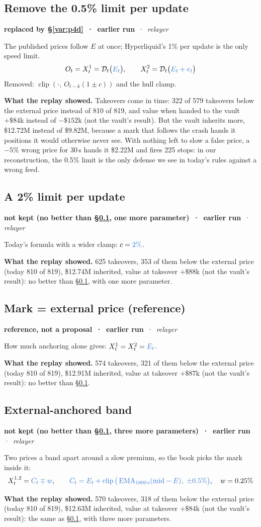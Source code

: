 \documentclass[10.5pt,a4paper]{article}
\newcommand{\chg}[1]{\ensuremath{{\color[HTML]{2F74D0}#1}}}
\newcommand{\rem}[1]{\textcolor{rem}{\ensuremath{#1}}}
\newcommand{\clip}{\operatorname{clip}}
\newcommand{\ema}{\operatorname{EMA}}
\newcommand{\D}{\mathcal{D}}
\newcommand{\st}[3]{\textcolor{#1}{\textbf{#2}} \,·\, \emph{#3}\par}
\newcommand{\res}[1]{\par\textbf{What the replay showed.} #1\par}
\begin{document}
\subsection{Remove the 0.5\% limit per update}\label{var:p1}
\st{sup}{replaced by \S\ref{var:p4d} \,·\, earlier run}{relayer}
The published prices follow $E$ at once; Hyperliquid's 1\% per update is the only speed limit.
\begin{equation}
O_t = X^1_t = \D_t\big(\chg{E_t}\big),\qquad X^2_t = \D_t\big(\chg{E_t + e_t}\big)
\end{equation}
Removed: \rem{\clip(\cdot,\ O_{t-k}(1\pm c))} and the hull clamp.
\res{Takeovers come in time: 322 of 579 takeovers below the external price instead of 810 of 819, and value when handed to the vault $+\$84$k instead of $-\$152$k (not the vault's result). But the vault inherits more, \$12.72M instead of \$9.82M, because a mark that follows the crash hands it positions it would otherwise never see. With nothing left to slow a false price, a $-5\%$ wrong price for 30\,s hands it \$2.22M and fires 225 stops: in our reconstruction, the 0.5\% limit is the only defense we see in today's rules against a wrong feed.}

\subsection{A 2\% limit per update}\label{var:auto1}
\st{sup}{not kept (no better than \S\ref{var:p1}, one more parameter) \,·\, earlier run}{relayer}
Today's formula with a wider clamp: $c = \chg{2\%}$.
\res{625 takeovers, 353 of them below the external price (today 810 of 819), \$12.74M inherited, value at takeover $+\$88$k (not the vault's result): no better than \S\ref{var:p1}, with one more parameter.}

\subsection{Mark = external price (reference)}\label{var:auto2}
\st{sup}{reference, not a proposal \,·\, earlier run}{relayer}
How much anchoring alone gives: $X^1_t = X^2_t = \chg{E_t}$.
\res{574 takeovers, 321 of them below the external price (today 810 of 819), \$12.91M inherited, value at takeover $+\$87$k (not the vault's result): no better than \S\ref{var:p1}.}

\subsection{External-anchored band}\label{var:auto3}
\st{sup}{not kept (no better than \S\ref{var:p1}, three more parameters) \,·\, earlier run}{relayer}
Two prices a band apart around a slow premium, so the book picks the mark inside it:
\begin{equation}
X^{1,2}_t = \chg{C_t \mp w},\qquad \chg{C_t = E_t + \clip\big(\ema_{1800\,\text{s}}(\text{mid}-E),\ \pm 0.5\%\big)},\quad w = 0.25\%
\end{equation}
\res{570 takeovers, 318 of them below the external price (today 810 of 819), \$12.63M inherited, value at takeover $+\$84$k (not the vault's result): the same as \S\ref{var:p1}, with three more parameters.}
\end{document}
